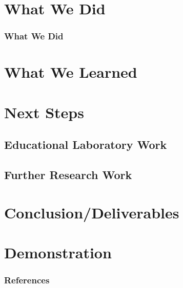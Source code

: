 \documentclass{eceday}
\begin{document}
\section{What We Did}\label{sec:What_We_Did}
\begin{frame}
  \frametitle{What We Did}
\end{frame}

\section{What We Learned}\label{sec:What_We_Learned}
\begin{frame}
  \frametitle{}
\end{frame}

\section{Next Steps}\label{sec:Next_Steps}
\subsection{Educational Laboratory Work}\label{subsec:Educational_Lab_Work}
\begin{frame}
  \frametitle{}
\end{frame}

\subsection{Further Research Work}\label{subsec:Further_Research_Work}
\begin{frame}
  \frametitle{}
\end{frame}

\section{Conclusion/Deliverables}\label{sec:Conclusion_Deliverables}
\begin{frame}
  \frametitle{}
\end{frame}

\section{Demonstration}\label{sec:Demonstration}
\begin{frame}
  \frametitle{}
\end{frame}

\begin{frame}
  \frametitle{References}

  \printbibliography[heading=bibintoc]{}
\end{frame}
\end{document}
